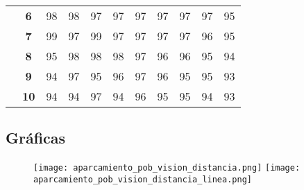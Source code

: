 \begin{table}[]
{\begin{tabular}{ccrrrrrrrrr}
\multicolumn{1}{c|}{} & \multicolumn{1}{c|}{\textbf{6}} & \multicolumn{1}{r|}{98} & \multicolumn{1}{r|}{98} & \multicolumn{1}{r|}{97} & \multicolumn{1}{r|}{97} & \multicolumn{1}{r|}{97} & \multicolumn{1}{r|}{97} & \multicolumn{1}{r|}{97} & \multicolumn{1}{r|}{97} & \multicolumn{1}{r|}{95} \\ \cline{2-11}
\multicolumn{1}{c|}{} & \multicolumn{1}{c|}{\textbf{7}} & \multicolumn{1}{r|}{99} & \multicolumn{1}{r|}{97} & \multicolumn{1}{r|}{99} & \multicolumn{1}{r|}{97} & \multicolumn{1}{r|}{97} & \multicolumn{1}{r|}{97} & \multicolumn{1}{r|}{97} & \multicolumn{1}{r|}{96} & \multicolumn{1}{r|}{95} \\ \cline{2-11}
\multicolumn{1}{c|}{} & \multicolumn{1}{c|}{\textbf{8}} & \multicolumn{1}{r|}{95} & \multicolumn{1}{r|}{98} & \multicolumn{1}{r|}{98} & \multicolumn{1}{r|}{98} & \multicolumn{1}{r|}{97} & \multicolumn{1}{r|}{96} & \multicolumn{1}{r|}{96} & \multicolumn{1}{r|}{95} & \multicolumn{1}{r|}{94} \\ \cline{2-11}
\multicolumn{1}{c|}{} & \multicolumn{1}{c|}{\textbf{9}} & \multicolumn{1}{r|}{94} & \multicolumn{1}{r|}{97} & \multicolumn{1}{r|}{95} & \multicolumn{1}{r|}{96} & \multicolumn{1}{r|}{97} & \multicolumn{1}{r|}{96} & \multicolumn{1}{r|}{95} & \multicolumn{1}{r|}{95} & \multicolumn{1}{r|}{93} \\ \cline{2-11}
\multicolumn{1}{c|}{} & \multicolumn{1}{c|}{\textbf{10}} & \multicolumn{1}{r|}{94} & \multicolumn{1}{r|}{94} & \multicolumn{1}{r|}{97} & \multicolumn{1}{r|}{94} & \multicolumn{1}{r|}{96} & \multicolumn{1}{r|}{95} & \multicolumn{1}{r|}{95} & \multicolumn{1}{r|}{94} & \multicolumn{1}{r|}{93} \\ \cline{2-11}
\end{tabular}%
}
\end{table}

\subsection{Gráficas}
\begin{figure}[h]
\texttt{[image: aparcamiento\_pob\_vision\_distancia.png]}
\texttt{[image: aparcamiento\_pob\_vision\_distancia\_linea.png]}
\centering
\end{figure}
